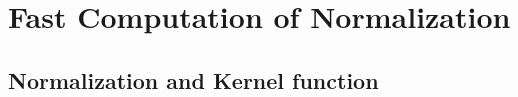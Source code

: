 \documentclass{article}
\begin{document}
\newpage


\section{Fast Computation of Normalization} 

\subsection{Normalization and Kernel function}
\end{document}
